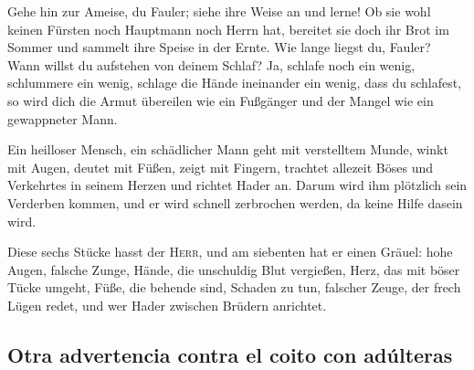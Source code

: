  Gehe hin zur Ameise, du Fauler; siehe ihre Weise an und
lerne!  Ob sie wohl keinen Fürsten noch Hauptmann noch
Herrn hat,  bereitet sie doch ihr Brot im Sommer und
sammelt ihre Speise in der Ernte.  Wie lange liegst du,
Fauler? Wann willst du aufstehen von deinem Schlaf?  Ja,
schlafe noch ein wenig, schlummere ein wenig, schlage die Hände
ineinander ein wenig, dass du schlafest,  so wird dich
die Armut übereilen wie ein Fußgänger und der Mangel wie ein gewappneter
Mann.

 Ein heilloser Mensch, ein schädlicher Mann geht mit
verstelltem Munde,  winkt mit Augen, deutet mit Füßen,
zeigt mit Fingern,  trachtet allezeit Böses und
Verkehrtes in seinem Herzen und richtet Hader an.  Darum
wird ihm plötzlich sein Verderben kommen, und er wird schnell zerbrochen
werden, da keine Hilfe dasein wird.

 Diese sechs Stücke hasst der \textsc{Herr}, und am
siebenten hat er einen Gräuel:  hohe Augen, falsche
Zunge, Hände, die unschuldig Blut vergießen,  Herz, das
mit böser Tücke umgeht, Füße, die behende sind, Schaden zu tun,
 falscher Zeuge, der frech Lügen redet, und wer Hader
zwischen Brüdern anrichtet.

\hypertarget{otra-advertencia-contra-el-coito-con-aduxfalteras}{%
\subsection{Otra advertencia contra el coito con
adúlteras}\label{otra-advertencia-contra-el-coito-con-aduxfalteras}}

